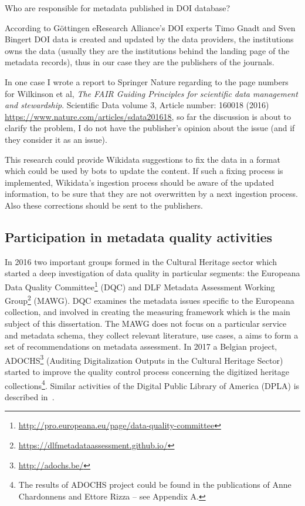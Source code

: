 Who are responsible for metadata published in DOI database?

According to Göttingen eResearch Alliance's DOI experts Timo Gnadt and Sven Bingert DOI data is created and updated by the data providers, the institutions owns the data (usually they are the institutions behind the landing page of the metadata records), thus in our case they are the publishers of the journals.

In one case I wrote a report to Springer Nature regarding to the page numbers for Wilkinson et al, \emph{The FAIR Guiding Principles for scientific data management and stewardship}. Scientific Data volume 3, Article number: 160018 (2016) \url{https://www.nature.com/articles/sdata201618}, so far the discussion is about to clarify the problem, I do not have the publisher's opinion about the issue (and if they consider it as an issue).

This research could provide Wikidata suggestions to fix the data in a format which could be used by bots to update the content. If such a fixing process is implemented, Wikidata's ingestion process should be aware of the updated information, to be sure that they are not overwritten by a next ingestion process. Also these corrections should be sent to the publishers.

\subsection{Participation in metadata quality activities}

In 2016 two important groups formed in the Cultural Heritage sector which started a deep investigation of data quality in particular segments: the Europeana Data Quality Committee\footnote{\url{http://pro.europeana.eu/page/data-quality-committee}} (DQC) and DLF Metadata Assessment Working Group\footnote{\url{https://dlfmetadataassessment.github.io/}} (MAWG). DQC examines the metadata issues specific to the Europeana collection, and involved in creating the measuring framework which is the main subject of this dissertation. The MAWG does not focus on a particular service and metadata schema, they collect relevant literature, use cases, a aims to form a set of recommendations on metadata assessment. In 2017 a Belgian project, ADOCHS\footnote{\url{http://adochs.be/}} (Auditing Digitalization Outputs in the Cultural Heritage Sector) started to improve the quality control process concerning the digitized heritage collections\footnote{The results of ADOCHS project could be found in the publications of Anne Chardonnens and Ettore Rizza -- see Appendix A.}. Similar activities of the Digital Public Library of America (DPLA) is described in~\cite{gueguen2019}.

